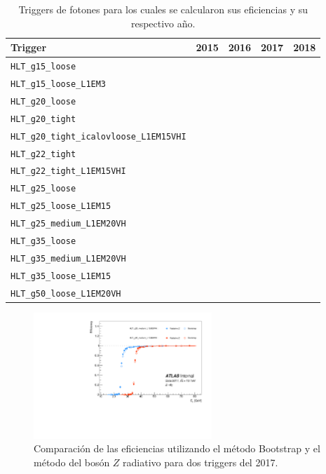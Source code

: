 \begin{table}
	\centering
	\caption{Triggers de fotones para los cuales se calcularon sus eficiencias y su respectivo año.}
	\begin{tabular}{ l | l | l | l | l }

		\hline
		\hline

		Trigger & 2015 & 2016 & 2017 & 2018 \\

		\hline
		\hline

		\texttt{HLT\_g15\_loose} & \cmark & \cmark &  &  \\
		\texttt{HLT\_g15\_loose\_L1EM3} &  &  & \cmark & \cmark \\
		\texttt{HLT\_g20\_loose} & \cmark & \cmark &  &  \\
		\texttt{HLT\_g20\_tight} & \cmark & \cmark &  &  \\
		\texttt{HLT\_g20\_tight\_icalovloose\_L1EM15VHI} &  &  & \cmark & \cmark \\
		\texttt{HLT\_g22\_tight} &  & \cmark &  &  \\
		\texttt{HLT\_g22\_tight\_L1EM15VHI} &  &  & \cmark & \cmark \\
		\texttt{HLT\_g25\_loose} & \cmark & \cmark & \cmark & \cmark \\
		\texttt{HLT\_g25\_loose\_L1EM15} & \cmark &  &  &  \\
		\texttt{HLT\_g25\_medium\_L1EM20VH} &  &  & \cmark & \cmark \\
		\texttt{HLT\_g35\_loose} & \cmark & \cmark &  &  \\
		\texttt{HLT\_g35\_medium\_L1EM20VH} &  &  & \cmark & \cmark \\
		\texttt{HLT\_g35\_loose\_L1EM15} & \cmark &  &  &  \\
		\texttt{HLT\_g50\_loose\_L1EM20VH} &  &  & \cmark & \cmark \\

		\hline
		\hline

	\end{tabular}
	\label{tab:trigg_eff}
\end{table}





\begin{figure}
  \centering
  \includegraphics[width=0.6\textwidth]{images/trigger/comp_eff_et_bootstrap.pdf}
	\caption{Comparación de las eficiencias utilizando el método Bootstrap y el método del bosón $Z$ radiativo para dos triggers del 2017.}
  \label{fig:bs_vs_zrad}
\end{figure}


